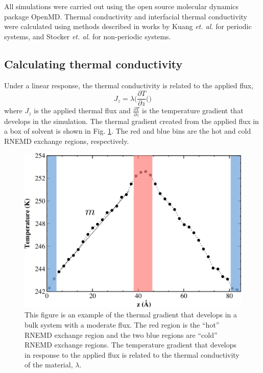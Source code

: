 All simulations were carried out using the open source molecular dynamics package OpenMD.\cite{openmd}
Thermal conductivity and interfacial thermal conductivity were calculated using methods described in works by Kuang \textit{et. al.} for periodic systems,\cite{Kuang:2011ef} and Stocker \textit{et. al.}  for non-periodic systems.\cite{Stocker:2014qq}

\subsection{Calculating thermal conductivity}
Under a linear response, the thermal conductivity is related to the applied flux,
\begin{equation}
    J_z = \lambda \Big(\frac{\partial T}{\partial z}(\Big)	
\end{equation}
where $J_z$ is the applied thermal flux and $\frac{\partial T}{\partial z}$ is the temperature gradient that develops in the simulation.
The thermal gradient created from the applied flux in a box of solvent is shown in Fig. \ref{fig:lambda-grad}. The red and blue bins are the hot and cold RNEMD exchange regions, respectively.

\begin{figure}
    \includegraphics[scale=0.6]{figures/bulk-gradient.pdf}
    \caption{This figure is an example of the thermal gradient that develops in a bulk system with a moderate flux. The red region is the ``hot'' RNEMD exchange region and the two blue regions are ``cold'' RNEMD exchange regions. The temperature gradient that develops in response to the applied flux is related to the thermal conductivity of the material, $\lambda$.}
    \label{fig:lambda-grad}
\end{figure}

